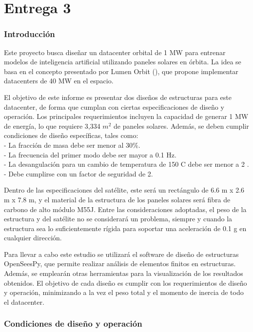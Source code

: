 \part{Entrega 3}

\section{Introducción}

Este proyecto busca diseñar un datacenter orbital de 1 MW para entrenar modelos de inteligencia artificial utilizando paneles solares en órbita. La idea se basa en el concepto presentado por Lumen Orbit (\cite{lumenorbit}), que propone implementar datacenters de 40 MW en el espacio.

El objetivo de este informe es presentar dos diseños de estructuras para este datacenter, de forma que cumplan con ciertas especificaciones de diseño y operación. Los principales requerimientos incluyen la capacidad de generar 1 MW de energía, lo que requiere 3,334 $m^2$ de paneles solares. Además, se deben cumplir condiciones de diseño específicas, tales como:\\
- La fracción de masa debe ser menor al 30\%.\\
- La frecuencia del primer modo debe ser mayor a 0.1 Hz.\\
- La desangulación para un cambio de temperatura de 150 \textdegree{}C debe ser menor a 2 \textdegree.\\
- Debe cumplirse con un factor de seguridad de 2.

Dentro de las especificaciones del satélite, este será un rectángulo de 6.6 m x 2.6 m x 7.8 m, y el material de la estructura de los paneles solares será fibra de carbono de alto módulo M55J. Entre las consideraciones adoptadas, el peso de la estructura y del satélite no se considerará un problema, siempre y cuando la estructura sea lo suficientemente rígida para soportar una aceleración de 0.1 g en cualquier dirección.

Para llevar a cabo este estudio se utilizará el software de diseño de estructuras OpenSeesPy, que permite realizar análisis de elementos finitos en estructuras. Además, se emplearán otras herramientas para la visualización de los resultados obtenidos. El objetivo de cada diseño es cumplir con los requerimientos de diseño y operación, minimizando a la vez el peso total y el momento de inercia de todo el datacenter.

\newpage
\section{Condiciones de diseño y operación}

